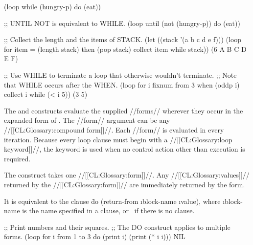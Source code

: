 \code
 (loop while (hungry-p) do (eat))
 
;; UNTIL NOT is equivalent to WHILE.
 (loop until (not (hungry-p)) do (eat))
 
;; Collect the length and the items of STACK.
 (let ((stack '(a b c d e f)))
   (loop for item = (length stack) then (pop stack)
         collect item
         while stack))
\EV (6 A B C D E F)
 
;; Use WHILE to terminate a loop that otherwise wouldn't terminate.
;; Note that WHILE occurs after the WHEN.
 (loop for i fixnum from 3
       when (oddp i) collect i
       while (< i 5))
\EV (3 5)
\endcode

\endsubsubsection%

\endsubsection%

 
The  and  constructs 
evaluate the 
supplied //forms// 
wherever they occur in the expanded form of .
 The //form// argument can be any //[[CL:Glossary:compound form]]//.
Each //form// is evaluated in every iteration.
Because every loop clause must begin with a //[[CL:Glossary:loop keyword]]//, 
the keyword  is used when no control action other than execution is 
required.
 


 The  construct takes one //[[CL:Glossary:form]]//. 
 Any //[[CL:Glossary:values]]// returned by the //[[CL:Glossary:form]]// 
 are immediately returned by the  form.

  It is equivalent to the clause
  \f{do (return-from \i{block-name} \i{value})},
  where \i{block-name} is the name specified in a 
  clause, or \nil\ if there is no  clause.

 

\code
;; Print numbers and their squares.
;; The DO construct applies to multiple forms.
 (loop for i from 1 to 3
       do (print i)
          (print (* i i)))
\EV NIL

\endcode

\endsubsubsection%

\endsubsection%

